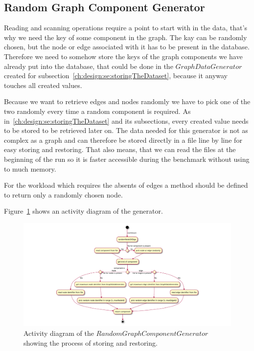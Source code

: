 \subsection{Random Graph Component Generator}
Reading and scanning operations require a point to start with in the data,
that's why we need the key of some component in the graph.
The kay can be randomly chosen,
but the node or edge associated with it has to be present in the database.
Therefore we need to somehow store the keys of the graph components we have already put into the database,
that could be done in the $ GraphDataGenerator $ created for subsection~\ref{ch:design:se:storingTheDataset},
because it anyway touches all created values.

Because we want to retrieve edges and nodes randomly we have to pick one of the two randomly every time a random component is required.
As in~\ref{ch:design:se:storingTheDataset} and its subsections,
every created value needs to be stored to be retrieved later on.
The data needed for this generator is not as complex as a graph and can therefore be stored directly in a file line by line for easy storing and restoring.
That also means,
that we can read the files at the beginning of the run so it is faster accessible during the benchmark without using to much memory.

For the workload which requires the absents of edges a method should be defined to return only a randomly chosen node.

Figure~\ref{fig:randomGraphComponentGenerator} shows an activity diagram of the generator.

\begin{figure}
  \includegraphics{images/extensions/randomGraphComponentGenerator}
  \caption{Activity diagram of the $ RandomGraphComponentGenerator $ showing the process of storing and restoring.\todo{}}
  \label{fig:randomGraphComponentGenerator}
\end{figure}

